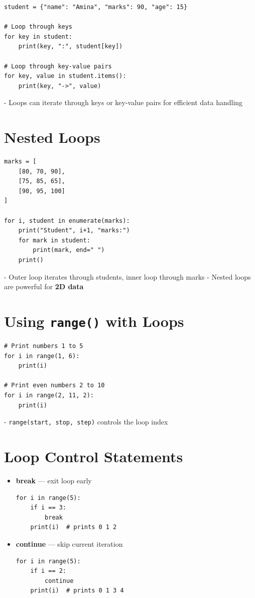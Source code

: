 \begin{verbatim}
student = {"name": "Amina", "marks": 90, "age": 15}

# Loop through keys
for key in student:
    print(key, ":", student[key])

# Loop through key-value pairs
for key, value in student.items():
    print(key, "->", value)
\end{verbatim}

- Loops can iterate through keys or key-value pairs for efficient data handling  

\section{Nested Loops}

\begin{verbatim}
marks = [
    [80, 70, 90],
    [75, 85, 65],
    [90, 95, 100]
]

for i, student in enumerate(marks):
    print("Student", i+1, "marks:")
    for mark in student:
        print(mark, end=" ")
    print()
\end{verbatim}

- Outer loop iterates through students, inner loop through marks  
- Nested loops are powerful for \textbf{2D data}  

\section{Using \texttt{range()} with Loops}

\begin{verbatim}
# Print numbers 1 to 5
for i in range(1, 6):
    print(i)

# Print even numbers 2 to 10
for i in range(2, 11, 2):
    print(i)
\end{verbatim}

- \texttt{range(start, stop, step)} controls the loop index  

\section{Loop Control Statements}

\begin{itemize}
    \item \textbf{break} — exit loop early  
\begin{verbatim}
for i in range(5):
    if i == 3:
        break
    print(i)  # prints 0 1 2
\end{verbatim}

    \item \textbf{continue} — skip current iteration  
\begin{verbatim}
for i in range(5):
    if i == 2:
        continue
    print(i)  # prints 0 1 3 4
\end{verbatim}
\end{itemize}


